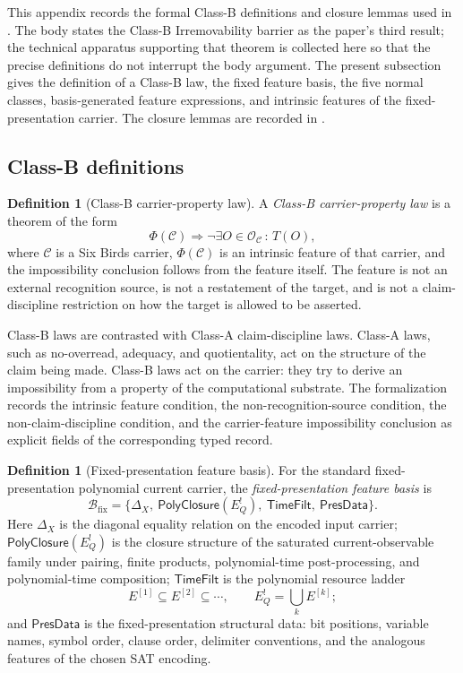\documentclass[11pt]{article}
\newcommand{\EQbang}{E^{!}_{Q}}
\theoremstyle{definition}
\newtheorem{definition}[theorem]{Definition}
\begin{document}
This appendix records the formal Class-B definitions and closure
lemmas used in .  The body states the
Class-B Irremovability barrier as the paper's third result; the
technical apparatus supporting that theorem is collected here so that
the precise definitions do not interrupt the body argument.  The
present subsection gives the definition of a Class-B law, the fixed
feature basis, the five normal classes, basis-generated feature
expressions, and intrinsic features of the fixed-presentation carrier.
The closure lemmas are recorded in .

\subsection{Class-B definitions}
\label{app:class-b-definitions}

\begin{definition}[Class-B carrier-property law]
\label{def:pvnp:class-b-law}
A \emph{Class-B carrier-property law} is a theorem of the form
\[
  \Phi(\mathcal C) \Longrightarrow
  \neg \exists O\in\mathcal O_{\mathcal C}\,:\,T(O),
\]
where \(\mathcal C\) is a Six Birds carrier, \(\Phi(\mathcal C)\) is
an intrinsic feature of that carrier, and the impossibility conclusion
follows from the feature itself.  The feature is not an external
recognition source, is not a restatement of the target, and is not a
claim-discipline restriction on how the target is allowed to be
asserted.
\end{definition}

Class-B laws are contrasted with Class-A claim-discipline laws.
Class-A laws, such as no-overread, adequacy, and quotientality, act on
the structure of the claim being made.  Class-B laws act on the
carrier: they try to derive an impossibility from a property of the
computational substrate.  The formalization records the intrinsic
feature condition, the non-recognition-source condition, the
non-claim-discipline condition, and the carrier-feature impossibility
conclusion as explicit fields of the corresponding typed record.

\begin{definition}[Fixed-presentation feature basis]
\label{def:pvnp:basis-fix}
For the standard fixed-presentation polynomial current carrier, the
\emph{fixed-presentation feature basis} is
\[
  \mathcal B_{\mathrm{fix}}
  =
  \{\Delta_X,\ \mathsf{PolyClosure}(\EQbang),\
    \mathsf{TimeFilt},\ \mathsf{PresData}\}.
\]
Here \(\Delta_X\) is the diagonal equality relation on the encoded
input carrier; \(\mathsf{PolyClosure}(\EQbang)\) is the closure
structure of the saturated current-observable family under pairing,
finite products, polynomial-time post-processing, and polynomial-time
composition; \(\mathsf{TimeFilt}\) is the polynomial resource ladder
\[
  E^{[1]}\subseteq E^{[2]}\subseteq \cdots,
  \qquad
  \EQbang=\bigcup_k E^{[k]};
\]
and \(\mathsf{PresData}\) is the fixed-presentation structural data:
bit positions, variable names, symbol order, clause order, delimiter
conventions, and the analogous features of the chosen SAT encoding.
\end{definition}
\end{document}

